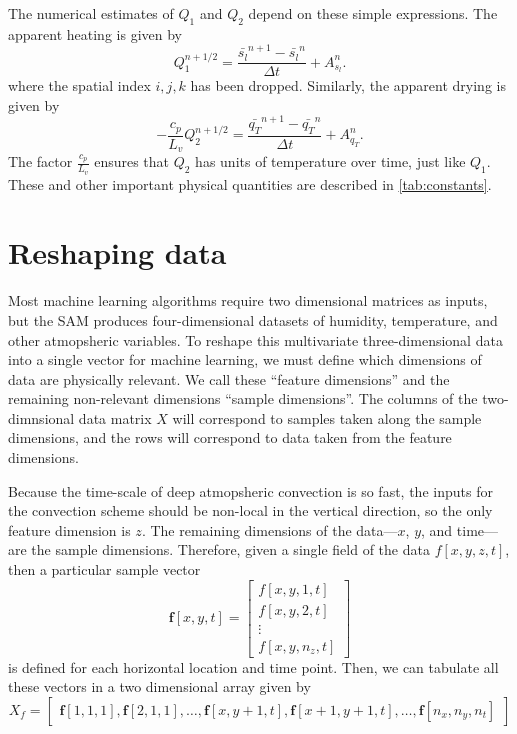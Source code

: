 \documentclass{report}
\newcommand{\1}[1]{\mathds{1}\left[#1\right]}
\begin{document}
The numerical estimates of $Q_1$ and $Q_2$ depend on these simple expressions.
The apparent heating is given by
\begin{equation}
  \label{eq:q1-num}
  Q_1^{n+1/2} = \frac{\bar{s_l}^{n+1} - \bar{s_l}^{n} }{\Delta t}
            +  A^{n}_{s_l} .
\end{equation}
where the spatial index $i,j,k$ has been dropped. Similarly, the apparent
drying is given by
\begin{equation}
  \label{eq:q2-num}
  -\frac{c_p}{L_v} Q_2^{n+1/2} = \frac{\bar{q_T}^{n+1} - \bar{q_T}^{n} }{\Delta t}
            +  A^{n}_{q_T} .
\end{equation}
The factor $\frac{c_p}{L_v}$ ensures that $Q_2$ has units of temperature over
time, just like $Q_1$. These and other important physical quantities are
described in \autoref{tab:constants}.

\section{Reshaping data}

Most machine learning algorithms require two dimensional matrices as inputs, but
the SAM produces four-dimensional datasets of humidity, temperature, and other
atmopsheric variables. 
To reshape this multivariate three-dimensional data into a single vector for
machine learning, we must define which dimensions of data are physically
relevant. 
We call these ``feature dimensions'' and the remaining non-relevant dimensions
``sample dimensions''. The columns of the two-dimnsional data matrix $X$ will
correspond to samples taken along the sample dimensions, and the rows will
correspond to data taken from the feature dimensions. 

Because the time-scale of deep atmopsheric convection is so fast, the inputs for
the convection scheme should be non-local in the vertical direction, so the only
feature dimension is $z$. 
The remaining dimensions of the data---$x$, $y$, and time---are the sample
dimensions. 
Therefore, given a single field of the data $f[x,y,z,t]$, then a particular sample vector
\[
  \mathbf{f}[x,y,t] =
    \begin{bmatrix}
      f[x,y,1,t] \\
      f[x,y,2,t] \\
      \vdots\\
      f[x,y,n_z,t]
    \end{bmatrix}
\]
is defined for each horizontal location and time point. Then, we can tabulate
all these vectors in a two dimensional array given by
\newcommand{\fb}{\mathbf{f}}
\[
  X_f = 
  \begin{bmatrix}
    \fb[1,1,1], \fb[2,1,1], \ldots,\fb[x,y+1,t], \fb[x+1,y+1,t],\ldots,\fb[n_x, n_y,
    n_t]
  \end{bmatrix}
\]
\end{document}
